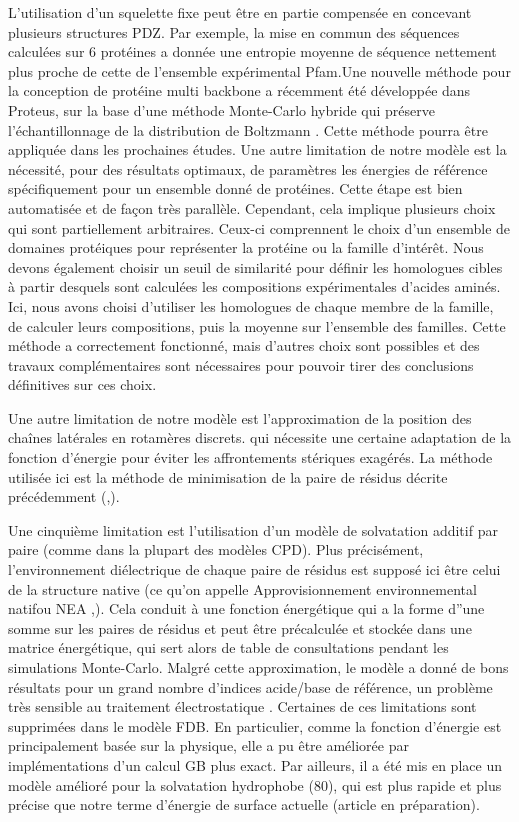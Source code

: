 L'utilisation d'un squelette fixe peut être en partie compensée en concevant plusieurs structures PDZ. Par exemple, la mise en commun des séquences calculées sur 6 protéines a donnée une entropie moyenne de séquence nettement plus proche de cette de l'ensemble expérimental  Pfam.Une nouvelle méthode pour la conception de protéine multi backbone a récemment été développée dans Proteus, sur la base d'une méthode Monte-Carlo hybride qui préserve l'échantillonnage de la distribution de Boltzmann \cite{Druart17}. Cette méthode pourra être appliquée dans les prochaines études.
Une autre limitation de notre modèle est la nécessité, pour des résultats optimaux, de paramètres les énergies de référence spécifiquement pour un ensemble donné de protéines. Cette étape est bien automatisée et de façon très parallèle. Cependant, cela implique plusieurs choix qui sont partiellement arbitraires. Ceux-ci comprennent le choix d'un ensemble de domaines protéiques pour représenter la protéine ou la famille d'intérêt. Nous devons également choisir un seuil de similarité pour définir les homologues cibles à partir desquels sont calculées les compositions expérimentales d'acides aminés. Ici, nous avons choisi d'utiliser les homologues de chaque membre de la famille, de calculer leurs compositions, puis la moyenne sur l'ensemble des familles. Cette méthode a correctement fonctionné, mais d'autres choix sont possibles et des travaux complémentaires sont nécessaires pour pouvoir tirer des conclusions définitives sur ces choix.

Une autre limitation de notre modèle est l'approximation de la position des chaînes latérales en rotamères discrets. qui nécessite une certaine adaptation de la fonction d'énergie pour éviter les affrontements stériques exagérés. La méthode utilisée ici est la méthode de minimisation de la paire de résidus décrite précédemment (\cite{26},\cite{76}).

Une cinquième limitation est l'utilisation d'un modèle de solvatation additif par paire (comme dans la plupart des modèles CPD). Plus précisément, l'environnement diélectrique de chaque paire de résidus est supposé ici être celui de la structure native (ce qu'on appelle \og Approvisionnement environnemental natif\fg ou NEA \cite{74},\cite{76}). Cela conduit à une fonction énergétique qui a la forme d''une somme sur les paires de résidus et peut être précalculée et stockée dans une matrice énergétique, qui sert alors de table de consultations pendant les simulations Monte-Carlo. Malgré cette approximation, le modèle a donné de bons résultats pour un grand nombre d'indices acide/base de référence, un problème très sensible au traitement électrostatique \cite{Polydorides13}. Certaines de ces limitations sont supprimées dans le modèle FDB. En particulier, comme la fonction d'énergie est principalement basée sur la physique, elle a pu être améliorée par implémentations d'un calcul GB plus exact. Par ailleurs, il a été mis en place un modèle amélioré pour la solvatation hydrophobe (80), qui est plus rapide et plus précise que notre terme d'énergie de surface actuelle (article en préparation).

